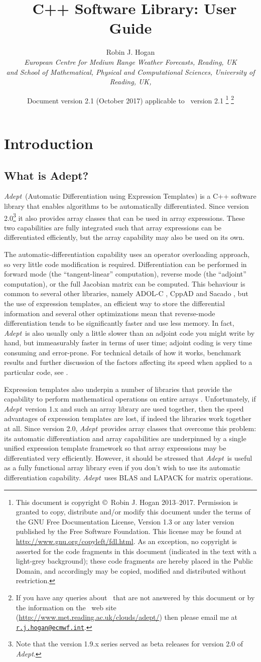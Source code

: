 \documentclass[a4,oneside]{book}
\title{\Adept\ C++ Software Library: User Guide}
\author{Robin J. Hogan\\ \emph{European Centre for Medium Range
    Weather Forecasts, Reading, UK}\\ \emph{and School of
    Mathematical, Physical and Computational Sciences, University of
    Reading, UK,}}
\date{Document version 2.1 (October 2017) applicable to \Adept\ version
  2.1 \thanks{This document is copyright \copyright\ Robin J. Hogan
    2013--2017.  Permission is granted to copy, distribute and/or
    modify this document under the terms of the GNU Free Documentation
    License, Version 1.3 or any later version published by the Free
    Software Foundation. This license may be found at
    \url{http://www.gnu.org/copyleft/fdl.html}.  As an exception, no
    copyright is asserted for the code fragments in this document
    (indicated in the text with a light-grey background); these code
    fragments are hereby placed in the Public Domain, and accordingly
    may be copied, modified and distributed without restriction.}
  \thanks{If you have any queries about \Adept\ that are not answered
    by this document or by the information on the \Adept\ web site
    (\url{http://www.met.reading.ac.uk/clouds/adept/}) then please
    email me at
    \href{mailto:r.j.hogan@ecmwf.int}{\texttt{r.j.hogan@ecmwf.int}}.}}
\def\Adept{\emph{Adept}}
\renewcommand\thefootnote{\relax}
\begin{document}
\maketitle

\tableofcontents
\def\thefootnote{\fnsymbol{footnote}}
\chapter{Introduction}
\section{What is Adept?}
\Adept\ (Automatic Differentiation using Expression Templates) is a
C++ software library that enables algorithms to be automatically
differentiated. Since version 2.0\footnote{Note that the version 1.9.x
  series served as beta releases for version 2.0 of \Adept.} it also
provides array classes that can be used in array expressions.  These
two capabilities are fully integrated such that array expressions can
be differentiated efficiently, but the array capability may also be
used on its own.

The automatic-differentiation capability uses an operator overloading
approach, so very little code modification is
required. Differentiation can be performed in forward mode (the
``tangent-linear'' computation), reverse mode (the ``adjoint''
computation), or the full Jacobian matrix can be computed. This
behaviour is common to several other libraries, namely ADOL-C
\citep{Griewank+1996}, CppAD \citep{Bell2007} and Sacado
\citep{Gay2005}, but the use of expression templates, an efficient way
to store the differential information and several other optimizations
mean that reverse-mode differentiation tends to be significantly
faster and use less memory. In fact, \Adept\ is also usually only a
little slower than an adjoint code you might write by hand, but
immeasurably faster in terms of user time; adjoint coding is very time
consuming and error-prone. For technical details of how it works,
benchmark results and further discussion of the factors affecting its
speed when applied to a particular code, see \cite{Hogan2014}.

Expression templates also underpin a number of libraries that provide
the capability to perform mathematical operations on entire arrays
\citep{Veldhuizen1995}. Unfortunately, if \Adept\ version 1.x and such
an array library are used together, then the speed advantages of
expression templates are lost, if indeed the libraries work together
at all. Since version 2.0, \Adept\ provides array classes that
overcome this problem: its automatic differentiation and array
capabilities are underpinned by a single unified expression template
framework so that array expressions may be differentiated very
efficiently.  However, it should be stressed that \Adept\ is useful as
a fully functional array library even if you don't wish to use its
automatic differentiation capability. \Adept\ uses BLAS and LAPACK for
matrix operations.
\end{document}
